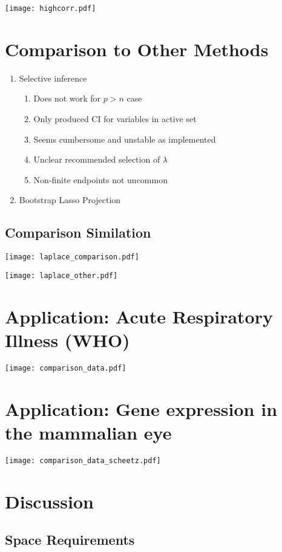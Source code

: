 \texttt{[image: highcorr.pdf]}

\section{Comparison to Other Methods}

\begin{enumerate}
\item Selective inference
\begin{enumerate}
\item Does not work for $p > n$ case
\item Only produced CI for variables in active set
\item Seems cumbersome and unstable as implemented
\item Unclear recommended selection of $\lambda$
\item Non-finite endpoints not uncommon
\end{enumerate}
\item{Bootstrap Lasso Projection}
\end{enumerate}

\subsection{Comparison Similation}

\texttt{[image: laplace\_comparison.pdf]}

\texttt{[image: laplace\_other.pdf]}

\section{Application: Acute Respiratory Illness (WHO)}

\texttt{[image: comparison\_data.pdf]}

\section{Application: Gene expression in the mammalian eye}

\texttt{[image: comparison\_data\_scheetz.pdf]}

\section{Discussion}

\subsection{Space Requirements}


